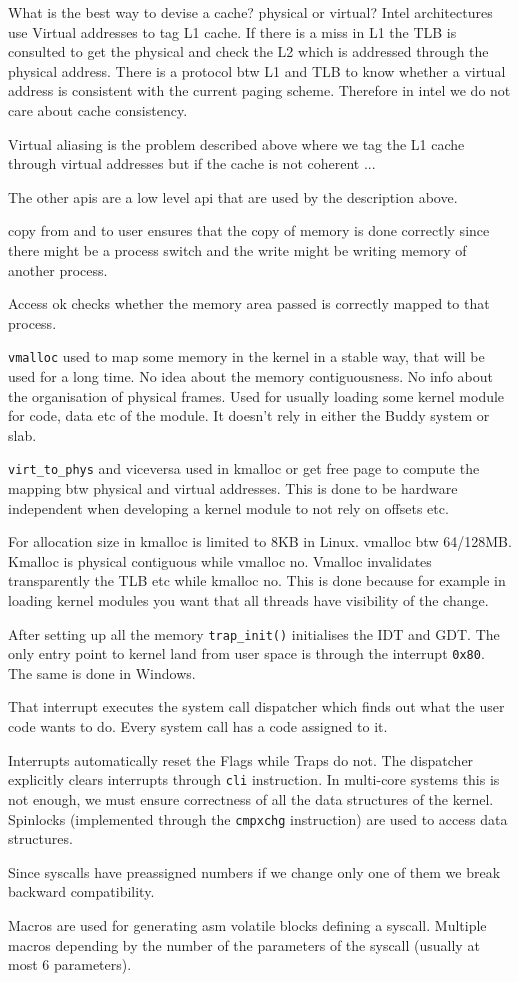 \documentclass[twoside]{article}
\begin{document}
What is the best way to devise a cache? physical or virtual? Intel architectures use Virtual addresses to tag L1 cache. If there is a miss in L1 the TLB is consulted to get the physical and check the L2 which is addressed through the physical address. There is a protocol btw L1 and TLB to know whether a virtual address is consistent with the current paging scheme. Therefore in intel we do not care about cache consistency.

Virtual aliasing is the problem described above where we tag the L1 cache through virtual addresses but if the cache is not coherent ...

The other apis are a low level api that are used by the description above.

copy from and to user ensures that the copy of memory is done correctly since there might be a process switch and the write might be writing memory of another process.

Access ok checks whether the memory area passed is correctly mapped to that process. 

\texttt{vmalloc} used to map some memory in the kernel in a stable way, that will be used for a long time. No idea about the memory contiguousness. No info about the organisation of physical frames. Used for usually loading some kernel module for code, data etc of the module. It doesn't rely in either the Buddy system or slab. 

\texttt{virt_to_phys} and viceversa used in kmalloc or get free page to compute the mapping btw physical and virtual addresses. This is done to be hardware independent when developing a kernel module to not rely on offsets etc. 

For allocation size in kmalloc is limited to 8KB in Linux. vmalloc btw 64/128MB. Kmalloc is physical contiguous while vmalloc no. Vmalloc invalidates transparently the TLB etc while kmalloc no. This is done because for example in loading kernel modules you want that all threads have visibility of the change. 

After setting up all the memory \texttt{trap\_init()} initialises the IDT and GDT.
The only entry point to kernel land from user space is through the interrupt \texttt{0x80}. The same is done in Windows.

That interrupt executes the system call dispatcher which finds out what the user code wants to do. Every system call has a code assigned to it.

Interrupts automatically reset the Flags while Traps do not. The dispatcher explicitly clears interrupts through \texttt{cli} instruction. In multi-core systems this is not enough, we must ensure correctness of all the data structures of the kernel. Spinlocks (implemented through the \texttt{cmpxchg} instruction) are used to access data structures.

Since syscalls have preassigned numbers if we change only one of them we break backward compatibility.

Macros are used for generating asm volatile blocks defining a syscall. Multiple macros depending by the number of the parameters of the syscall (usually at most 6 parameters).

\newpage


\end{document}
